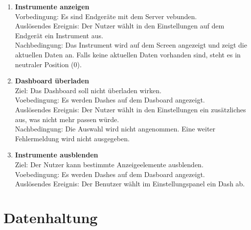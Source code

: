 \documentclass[pflichtenheft.tex]{subfiles}
\begin{document}
	\begin{enumerate}
	\setcounter{enumi}{\value{enumTemp}}
		\item{\textbf{Instrumente anzeigen}} \\Vorbedingung: Es sind Endgeräte mit dem Server vebunden.\\ Auslösendes Ereignis: Der Nutzer wählt in den Einstellungen auf dem Endgerät ein Instrument aus.\\ Nachbedingung: Das Instrument wird auf dem Screen angezeigt und zeigt die aktuellen Daten an. Falls keine aktuellen Daten vorhanden sind, steht es in neutraler Position (0).
		\item{\textbf{Dashboard überladen}} \\Ziel: Das Dashboard soll nicht überladen wirken. \\ Voebedingung: Es werden Dashes auf dem Dasboard angezeigt. \\Auslösendes Ereignis: Der Nutzer wählt in den Einstellungen ein zusätzliches aus, was nicht mehr passen würde. \\Nachbedingung: Die Auswahl wird nicht angenommen. Eine weiter Fehlermeldung wird nicht ausgegeben.
		\item{\textbf{Instrumente ausblenden}} \\Ziel: Der Nutzer kann bestimmte Anzeigeelemente ausblenden. \\Voebedingung: Es werden Dashes auf dem Dasboard angezeigt. \\Auslösendes Ereignis: Der Benutzer wählt im Einstellungspanel ein Dash ab.
		\setcounter{enumTemp}{\value{enumi}}
	\end{enumerate} 
	
	\section{\textbf{Datenhaltung}}
\end{document}
